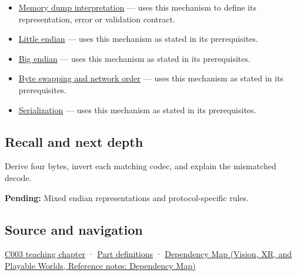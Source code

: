 \begin{itemize}
\item
  \hyperref[appendix-230b59c0676b]{Memory dump interpretation} --- uses this mechanism to define its representation, error or validation contract.
\item
  \hyperref[appendix-367b6abf460e]{Little endian} --- uses this mechanism as stated in its prerequisites.
\item
  \hyperref[appendix-92e040df969a]{Big endian} --- uses this mechanism as stated in its prerequisites.
\item
  \hyperref[appendix-11ba36693aa2]{Byte swapping and network order} --- uses this mechanism as stated in its prerequisites.
\item
  \hyperref[appendix-91d09ebed979]{Serialization} --- uses this mechanism as stated in its prerequisites.
\end{itemize}

\subsection{Recall and next depth}\label{appendix-bc07c3d25b18-recall-and-next-depth}

Derive four bytes, invert each matching codec, and explain the mismatched decode.

\textbf{Pending:} Mixed endian representations and protocol-specific rules.

\subsection{Source and navigation}\label{appendix-bc07c3d25b18-source-and-navigation}

\hyperref[01-foundations-i-ch002-where-the-bytes-live]{C003 teaching chapter} · \hyperref[appendix-fd090d982a15-m003---parts-41-60]{Part definitions} · \href{../07-Vision-XR-and-Playable-Worlds/main.pdf\#nameddest=appendix-4ad47bdd269a}{Dependency Map (Vision, XR, and Playable Worlds, Reference notes: Dependency Map)}
